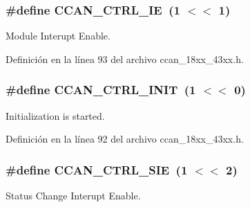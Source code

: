 \subsubsection[{\texorpdfstring{C\+C\+A\+N\+\_\+\+C\+T\+R\+L\+\_\+\+IE}{CCAN_CTRL_IE}}]{\setlength{\rightskip}{0pt plus 5cm}\#define C\+C\+A\+N\+\_\+\+C\+T\+R\+L\+\_\+\+IE~(1 $<$$<$ 1)}\hypertarget{group___c_c_a_n__18_x_x__43_x_x_gaa4d20674c2eed8d630afd662d12fecc8}{}\label{group___c_c_a_n__18_x_x__43_x_x_gaa4d20674c2eed8d630afd662d12fecc8}
Module Interupt Enable. 

Definición en la línea 93 del archivo ccan\+\_\+18xx\+\_\+43xx.\+h.

\subsubsection[{\texorpdfstring{C\+C\+A\+N\+\_\+\+C\+T\+R\+L\+\_\+\+I\+N\+IT}{CCAN_CTRL_INIT}}]{\setlength{\rightskip}{0pt plus 5cm}\#define C\+C\+A\+N\+\_\+\+C\+T\+R\+L\+\_\+\+I\+N\+IT~(1 $<$$<$ 0)}\hypertarget{group___c_c_a_n__18_x_x__43_x_x_ga67343de48aecd561cc46691a58fe1aa2}{}\label{group___c_c_a_n__18_x_x__43_x_x_ga67343de48aecd561cc46691a58fe1aa2}
Initialization is started. 

Definición en la línea 92 del archivo ccan\+\_\+18xx\+\_\+43xx.\+h.

\subsubsection[{\texorpdfstring{C\+C\+A\+N\+\_\+\+C\+T\+R\+L\+\_\+\+S\+IE}{CCAN_CTRL_SIE}}]{\setlength{\rightskip}{0pt plus 5cm}\#define C\+C\+A\+N\+\_\+\+C\+T\+R\+L\+\_\+\+S\+IE~(1 $<$$<$ 2)}\hypertarget{group___c_c_a_n__18_x_x__43_x_x_gaa0de0b1c4b72f922d1e69d3849830928}{}\label{group___c_c_a_n__18_x_x__43_x_x_gaa0de0b1c4b72f922d1e69d3849830928}
Status Change Interupt Enable. 

